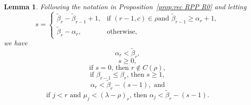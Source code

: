 \documentclass[12pt]{amsart}
\numberwithin{equation}{section}
\newtheorem{lem}[thm]{Lemma}
\theoremstyle{definition}
\newcommand\wb{\widetilde{\beta}}
\begin{document}
\begin{lem}\label{lem:s-1}
  Following the notation in Proposition~\ref{prop:rec RPP R0} 
  and letting
        \[
s = \begin{cases}
  \wb_r-\wb_{r-1}+1, & \mbox{if $(r-1,c)\in\rho$
  and $\wb_{r-1}\ge\alpha_r+1$} ,\\
\wb_r-\alpha_r, &\mbox{otherwise},
\end{cases}
  \]
 we have
 \begin{equation}
   \label{eq:8a}
   \alpha_r < \wb_r,
 \end{equation}
  \begin{equation}
    \label{eq:s>0}
   s \ge 0,
 \end{equation}
 \begin{equation}
   \label{eq:s=0-cond}
 \mbox{if $s = 0$, then }  r \notin C(\rho),
 \end{equation}
  \begin{equation}
    \label{eq:s>1}
\mbox{if $\beta_{r-1} \leq \beta_r$, then }   s \ge 1,
 \end{equation}
  \begin{equation}
    \label{eq:8}
     \alpha_r <\wb_r-(s-1), \mbox{ and}
  \end{equation}
  \begin{equation}
    \label{eq:11}
 \mbox{if $j<r$ and $\mu_j<(\lambda-\rho)_r$, then }   \alpha_j<\wb_r-(s-1).
  \end{equation}
\end{lem}
\end{document}
